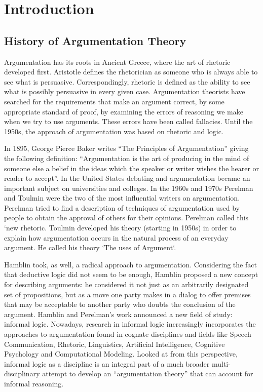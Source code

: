 \section{Introduction}
\subsection{History of Argumentation Theory}
\par
Argumentation has its roots in Ancient Greece, where the art of rhetoric developed first. Aristotle defines the rhetorician as someone who is always able to see what is persuasive. Correspondingly, rhetoric is defined as the ability to see what is possibly persuasive in every given case.  Argumentation theorists have searched for the requirements that make an argument correct, by some appropriate standard of proof, by examining the errors of reasoning we make when we try to use arguments. These errors have been called fallacies. Until the 1950s, the approach of argumentation was based on rhetoric and logic.
\par
In 1895, George Pierce Baker writes ``The Principles of Argumentation'' giving the following definition: ``Argumentation is the art of producing in the mind of someone else a belief in the ideas which the speaker or writer wishes the hearer or reader to accept''. In the United States debating and argumentation became an important subject on universities and colleges. In the 1960s and 1970s Perelman and Toulmin were the two of the most influential writers on argumentation. Perelman tried to find a description of techniques of argumentation used by people to obtain the approval of others for their opinions. Perelman called this `new rhetoric. Toulmin developed his theory (starting in 1950s) in order to explain how argumentation occurs in the natural process of an everyday argument. He called his theory `The uses of Argument`. 
\par
Hamblin took, as well, a radical approach to argumentation. Considering the fact that deductive logic did not seem to be enough, Hamblin proposed a new concept for describing arguments: he considered it not just as an arbitrarily designated set of propositions, but as a move one party makes in a dialog to offer premises that may be acceptable to another party who doubts the conclusion of the argument.
Hamblin and Perelman's work announced a new field of study: informal logic. Nowadays,  research in informal logic increasingly incorporates the approaches to argumentation found in cognate disciplines and fields like Speech Communication, Rhetoric, Linguistics, Artificial Intelligence, Cognitive Psychology and Computational Modeling. Looked at from this perspective, informal logic as a discipline is an integral part of a much broader multi-disciplinary attempt to develop an ``argumentation theory'' that can account for informal reasoning.

